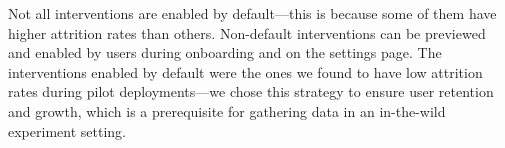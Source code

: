 
Not all interventions are enabled by default---this is because some of them have higher attrition rates than others. Non-default interventions can be previewed and enabled by users during onboarding and on the settings page. The interventions enabled by default were the ones we found to have low attrition rates during pilot deployments---we chose this strategy to ensure user retention and growth, which is a prerequisite for gathering data in an in-the-wild experiment setting.


